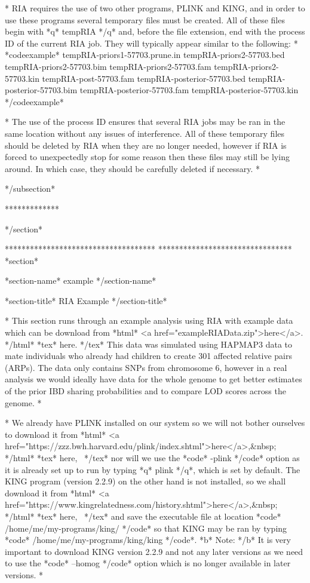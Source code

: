 *
RIA requires the use of two other programs, PLINK and KING, and in order to use these programs several temporary files must be created. All of these files begin with *q* tempRIA */q* and, before the file extension, end with the process ID of the current RIA job. They will typically appear similar to the following:
*
*codeexample*
tempRIA-priors1-57703.prune.in
tempRIA-priors2-57703.bed
tempRIA-priors2-57703.bim
tempRIA-priors2-57703.fam
tempRIA-priors2-57703.kin
tempRIA-post-57703.fam
tempRIA-posterior-57703.bed
tempRIA-posterior-57703.bim
tempRIA-posterior-57703.fam
tempRIA-posterior-57703.kin
*/codeexample*

*
The use of the process ID ensures that several RIA jobs may be ran in the same location without any issues of interference. All of these temporary files should be deleted by RIA when they are no longer needed, however if RIA is forced to unexpectedly stop for some reason then these files may still be lying around. In which case, they should be carefully deleted if necessary.
*

*/subsection*

*************

*/section*

************************************
********************************
*section*

*section-name*
example
*/section-name*

*section-title*
RIA Example
*/section-title*

*
This section runs through an example analysis using RIA with example data which can be download from *html* <a href="exampleRIAData.zip">here</a>. */html* *tex* here. */tex* This data was simulated using HAPMAP3 data to mate individuals who already had children to create 301 affected relative pairs (ARPs). The data only contains SNPs from chromosome 6, however in a real analysis we would ideally have data for the whole genome to get better estimates of the prior IBD sharing probabilities and to compare LOD scores across the genome.
*

*
We already have PLINK installed on our system so we will not bother ourselves to download it from *html* <a href="https://zzz.bwh.harvard.edu/plink/index.shtml">here</a>,&nbsp; */html* *tex* here,~ */tex* nor will we use the *code* -plink */code* option as it is already set up to run by typing *q* plink */q*, which is set by default. The KING program (version 2.2.9) on the other hand is not installed, so we shall download it from *html* <a href="https://www.kingrelatedness.com/history.shtml">here</a>,&nbsp; */html* *tex* here,~ */tex* and save the executable file at location *code* /home/me/my-programs/king/ */code* so that KING may be ran by typing *code* /home/me/my-programs/king/king */code*. *b* Note: */b* It is very important to download KING version 2.2.9 and not any later versions as we need to use the *code* --homog */code* option which is no longer available in later versions.
*

